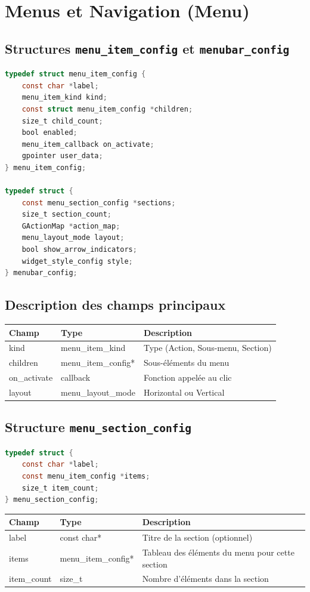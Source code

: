 \section{Menus et Navigation (Menu)}

\subsection{Structures \texttt{menu\_item\_config} et \texttt{menubar\_config}}
\begin{lstlisting}[language=C]
typedef struct menu_item_config {
    const char *label;
    menu_item_kind kind;
    const struct menu_item_config *children;
    size_t child_count;
    bool enabled;
    menu_item_callback on_activate;
    gpointer user_data;
} menu_item_config;

typedef struct {
    const menu_section_config *sections;
    size_t section_count;
    GActionMap *action_map;
    menu_layout_mode layout;
    bool show_arrow_indicators;
    widget_style_config style;
} menubar_config;
\end{lstlisting}

\subsection{Description des champs principaux}
\begin{center}
\begin{tabular}{|l|l|p{5cm}|}
\hline
\textbf{Champ} & \textbf{Type} & \textbf{Description} \\
\hline
kind & menu\_item\_kind & Type (Action, Sous-menu, Section) \\
\hline
children & menu\_item\_config* & Sous-éléments du menu \\
\hline
on\_activate & callback & Fonction appelée au clic \\
\hline
layout & menu\_layout\_mode & Horizontal ou Vertical \\
\hline
\end{tabular}
\end{center}
\subsection{Structure \texttt{menu\_section\_config}}
\begin{lstlisting}[language=C]
typedef struct {
    const char *label;
    const menu_item_config *items;
    size_t item_count;
} menu_section_config;
\end{lstlisting}
\begin{center}
\begin{tabular}{|l|l|>{\raggedright\arraybackslash}p{6cm}|}
\hline
\textbf{Champ} & \textbf{Type} & \textbf{Description} \\
\hline
label & const char* & Titre de la section (optionnel) \\
\hline
items & menu\_item\_config* & Tableau des éléments du menu pour cette section \\
\hline
item\_count & size\_t & Nombre d'éléments dans la section \\
\hline
\end{tabular}
\end{center}
